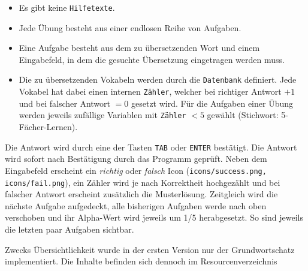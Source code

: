 \begin{itemize}
	\item Es gibt keine \texttt{Hilfetexte}.
	\item Jede Übung besteht aus einer endlosen Reihe von Aufgaben.
	\item Eine Aufgabe besteht aus dem zu übersetzenden Wort und einem Eingabefeld, in dem die gesuchte Übersetzung eingetragen werden muss.
	\item Die zu übersetzenden Vokabeln werden durch die \texttt{Datenbank} definiert.
		Jede Vokabel hat dabei einen internen \texttt{Zähler}, welcher bei richtiger Antwort $+1$ und bei falscher Antwort $=0$ gesetzt wird.
		Für die Aufgaben einer Übung werden jeweils zufällige Variablen mit \texttt{Zähler} $<5$ gewählt (Stichwort: 5-Fächer-Lernen).

\end{itemize}

Die Antwort wird durch eine der Tasten \texttt{TAB} oder \texttt{ENTER} bestätigt. 
Die Antwort wird sofort nach Bestätigung durch das Programm geprüft. 
Neben dem Eingabefeld erscheint ein \emph{richtig} oder \emph{falsch} Icon (\texttt{icons/success.png, icons/fail.png}), ein Zähler wird je nach Korrektheit hochgezählt und bei falscher Antwort erscheint zusätzlich die Musterlösung.
Zeitgleich wird die nächste Aufgabe aufgedeckt, alle bisherigen Aufgaben werde nach oben verschoben und ihr Alpha-Wert wird jeweils um 1/5 herabgesetzt.
So sind jeweils die letzten paar Aufgaben sichtbar.

Zwecks Übersichtlichkeit wurde in der ersten Version nur der Grundwortschatz implementiert. Die Inhalte befinden sich dennoch im Resourcenverzeichnis

